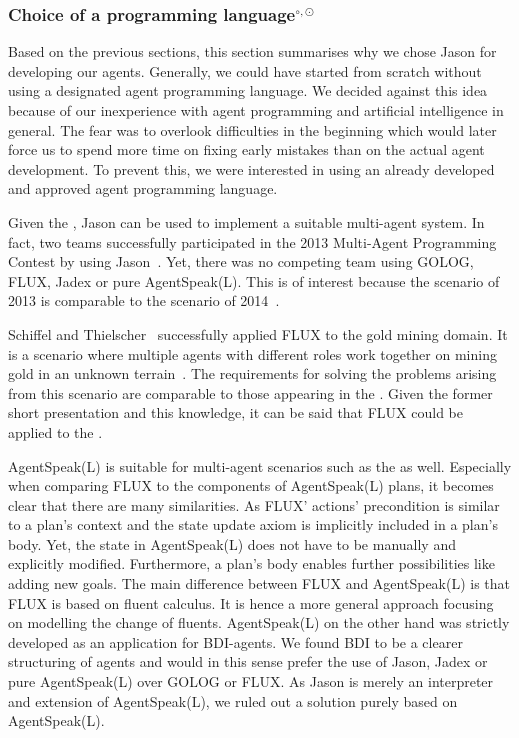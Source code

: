 \subsubsection[Choice of a programming language]{Choice of a programming language$^{\circ,\odot}$}\label{fun:apl_choice}
Based on the previous sections, this section summarises why we chose Jason for developing our agents.
Generally, we could have started from scratch without using a designated agent programming language.
We decided against this idea because of our inexperience with agent programming and artificial intelligence in general.
The fear was to overlook difficulties in the beginning which would later force us to spend more time on fixing early mistakes than on the actual agent development.
To prevent this, we were interested in using an already developed and approved agent programming language.

Given the \mars{}, Jason can be used to implement a suitable multi-agent system.
In fact, two teams successfully participated in the 2013 Multi-Agent Programming Contest by using Jason~\cite{ahlbrecht_multi_2013}. %
Yet, there was no competing team using GOLOG, FLUX, Jadex or pure AgentSpeak(L).
This is of interest because the scenario of 2013 is comparable to the scenario of 2014~\cite{ahlbrecht_mapc_2014}. %

Schiffel and Thielscher~\cite{schiffel_multi-agent_2007} successfully applied FLUX to the gold mining domain.
It is a scenario where multiple agents with different roles work together on mining gold in an unknown terrain~\cite{schiffel_multi-agent_2007}.
The requirements for solving the problems arising from this scenario are comparable to those appearing in the \mars{}.
Given the former short presentation and this knowledge, it can be said that FLUX could be applied to the \mars{}.

AgentSpeak(L) is suitable for multi-agent scenarios such as the \mars{} as well.
Especially when comparing FLUX to the components of AgentSpeak(L) plans, it becomes clear that there are many similarities.
As FLUX' actions' precondition is similar to a plan's context and the state update axiom is implicitly included in a plan's body.
Yet, the state in AgentSpeak(L) does not have to be manually and explicitly modified.
Furthermore, a plan's body enables further possibilities like adding new goals.
The main difference between FLUX and AgentSpeak(L) is that FLUX is based on fluent calculus.
It is hence a more general approach focusing on modelling the change of fluents.
AgentSpeak(L) on the other hand was strictly developed as an application for BDI-agents.
We found BDI to be a clearer structuring of agents and would in this sense prefer the use of Jason, Jadex or pure AgentSpeak(L) over GOLOG or FLUX.
As Jason is merely an interpreter and extension of AgentSpeak(L), we ruled out a solution purely based on AgentSpeak(L).

